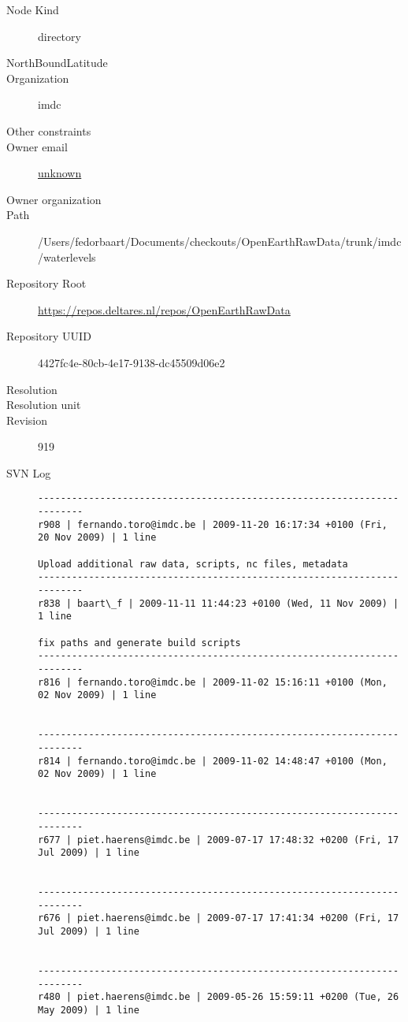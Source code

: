 \documentclass[9]{report}
\begin{document}
\begin{description}
  \item[Node Kind] directory
  \item[NorthBoundLatitude] 
  \item[Organization] imdc
  \item[Other constraints] 
  \item[Owner email] \href{mailto:unknown}{unknown}
  \item[Owner organization] 
  \item[Path] /Users/fedorbaart/Documents/checkouts/OpenEarthRawData/trunk/imdc/waterlevels
  \item[Repository Root] \href{https://repos.deltares.nl/repos/OpenEarthRawData}{https://repos.deltares.nl/repos/OpenEarthRawData}
  \item[Repository UUID] 4427fc4e-80cb-4e17-9138-dc45509d06e2
  \item[Resolution] 
  \item[Resolution unit] 
  \item[Revision] 919
  \item[SVN Log] \begin{verbatim}
------------------------------------------------------------------------
r908 | fernando.toro@imdc.be | 2009-11-20 16:17:34 +0100 (Fri, 20 Nov 2009) | 1 line

Upload additional raw data, scripts, nc files, metadata
------------------------------------------------------------------------
r838 | baart\_f | 2009-11-11 11:44:23 +0100 (Wed, 11 Nov 2009) | 1 line

fix paths and generate build scripts
------------------------------------------------------------------------
r816 | fernando.toro@imdc.be | 2009-11-02 15:16:11 +0100 (Mon, 02 Nov 2009) | 1 line


------------------------------------------------------------------------
r814 | fernando.toro@imdc.be | 2009-11-02 14:48:47 +0100 (Mon, 02 Nov 2009) | 1 line


------------------------------------------------------------------------
r677 | piet.haerens@imdc.be | 2009-07-17 17:48:32 +0200 (Fri, 17 Jul 2009) | 1 line


------------------------------------------------------------------------
r676 | piet.haerens@imdc.be | 2009-07-17 17:41:34 +0200 (Fri, 17 Jul 2009) | 1 line


------------------------------------------------------------------------
r480 | piet.haerens@imdc.be | 2009-05-26 15:59:11 +0200 (Tue, 26 May 2009) | 1 line


\end{verbatim}
\end{description}
\end{document}
